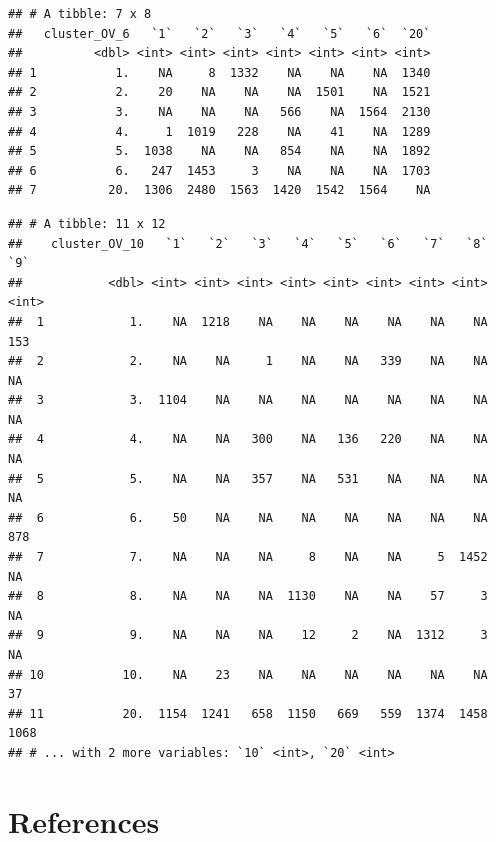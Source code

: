 \documentclass[floatsintext,man]{apa6}
\theoremstyle{definition}
\theoremstyle{definition}
\theoremstyle{definition}
\theoremstyle{remark}
\begin{document}
\begin{verbatim}
## # A tibble: 7 x 8
##   cluster_OV_6   `1`   `2`   `3`   `4`   `5`   `6`  `20`
##          <dbl> <int> <int> <int> <int> <int> <int> <int>
## 1           1.    NA     8  1332    NA    NA    NA  1340
## 2           2.    20    NA    NA    NA  1501    NA  1521
## 3           3.    NA    NA    NA   566    NA  1564  2130
## 4           4.     1  1019   228    NA    41    NA  1289
## 5           5.  1038    NA    NA   854    NA    NA  1892
## 6           6.   247  1453     3    NA    NA    NA  1703
## 7          20.  1306  2480  1563  1420  1542  1564    NA
\end{verbatim}

\begin{verbatim}
## # A tibble: 11 x 12
##    cluster_OV_10   `1`   `2`   `3`   `4`   `5`   `6`   `7`   `8`   `9`
##            <dbl> <int> <int> <int> <int> <int> <int> <int> <int> <int>
##  1            1.    NA  1218    NA    NA    NA    NA    NA    NA   153
##  2            2.    NA    NA     1    NA    NA   339    NA    NA    NA
##  3            3.  1104    NA    NA    NA    NA    NA    NA    NA    NA
##  4            4.    NA    NA   300    NA   136   220    NA    NA    NA
##  5            5.    NA    NA   357    NA   531    NA    NA    NA    NA
##  6            6.    50    NA    NA    NA    NA    NA    NA    NA   878
##  7            7.    NA    NA    NA     8    NA    NA     5  1452    NA
##  8            8.    NA    NA    NA  1130    NA    NA    57     3    NA
##  9            9.    NA    NA    NA    12     2    NA  1312     3    NA
## 10           10.    NA    23    NA    NA    NA    NA    NA    NA    37
## 11           20.  1154  1241   658  1150   669   559  1374  1458  1068
## # ... with 2 more variables: `10` <int>, `20` <int>
\end{verbatim}

\newpage

\section{References}\label{references}

\begingroup
\setlength{\parindent}{-0.5in} \setlength{\leftskip}{0.5in}

\hypertarget{refs}{}

\endgroup
\end{document}
